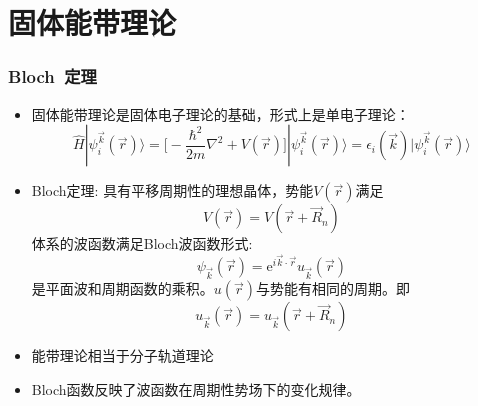 \small
\section{固体能带理论}       %
\frame
{
	\frametitle{\textrm{Bloch~}定理}
\begin{itemize}%
   \setlength{\itemsep}{8pt}
   \item 固体能带理论是固体电子理论的基础，形式上是单电子理论：
    $$\hat H |\psi_i^{\vec k}(\vec r)\rangle=\bigg[-\dfrac{\hbar^2}{2m}\nabla^2+V(\vec r)\bigg]|\psi_i^{\vec k}(\vec r)\rangle=\epsilon_i(\vec k)|\psi_i^{\vec k}(\vec r)\rangle$$
  \item \textrm{Bloch}定理:
具有平移周期性的理想晶体，势能$V(\vec r)$满足$$V(\vec r)=V(\vec r+\vec R_n)$$
体系的波函数满足\textrm{Bloch}波函数形式:$$\psi_{\vec k}(\vec r)=\textrm{e}^{i\vec k\cdot\vec r}u_{\vec k}(\vec r)$$
是平面波和周期函数的乘积。$u(\vec r)$与势能有相同的周期。即$$u_{\vec k}(\vec r)=u_{\vec k}(\vec r+\vec R_n)$$
  \item 能带理论相当于分子轨道理论
\item \textrm{Bloch}函数反映了波函数在周期性势场下的变化规律。
\end{itemize}
}

